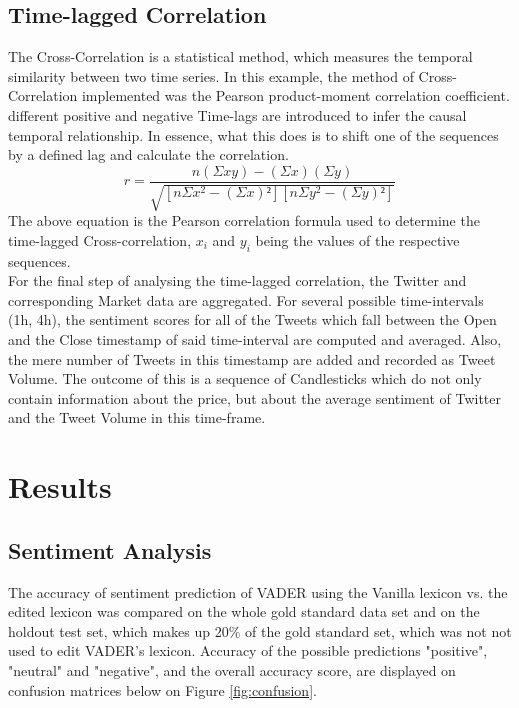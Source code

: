 \documentclass[11pt]{article}
\begin{document}
\subsection{Time-lagged Correlation}
The Cross-Correlation is a statistical method, which measures the temporal similarity between two time series. In this example, the method of Cross-Correlation implemented was the Pearson product-moment correlation coefficient. different positive and negative Time-lags are introduced to infer the causal temporal relationship. In essence, what this does is to shift one of the sequences by a defined lag and calculate the correlation. \\


\begin{equation}
r = \frac{n(\Sigma xy) - (\Sigma x)(\Sigma y)}{\sqrt{[n\Sigma x^2 - (\Sigma x)²] [n\Sigma y^2 - (\Sigma y)²]}}
\end{equation}
The above equation is the Pearson correlation formula used to determine the time-lagged Cross-correlation, $x_i$ and $y_i$ being the values of the respective sequences. \\

For the final step of analysing the time-lagged correlation, the Twitter and corresponding Market data are aggregated. For several possible time-intervals (1h, 4h), the sentiment scores for all of the Tweets which fall between the Open and the Close timestamp of said time-interval are computed and averaged. Also, the mere number of Tweets in this timestamp are added and recorded as Tweet Volume. The outcome of this is a sequence of Candlesticks which do not only contain information about the price, but about the average sentiment of Twitter and the Tweet Volume in this time-frame. \\

\section{Results}

\subsection{Sentiment Analysis}
The accuracy of sentiment prediction of VADER using the Vanilla lexicon vs. the edited lexicon was compared on the whole gold standard data set and on the holdout test set, which makes up 20\% of the gold standard set, which was not not used to edit VADER's lexicon. Accuracy of the possible predictions "positive", "neutral" and "negative", and the overall accuracy score, are displayed on confusion matrices below on Figure \ref{fig:confusion}.
\end{document}
